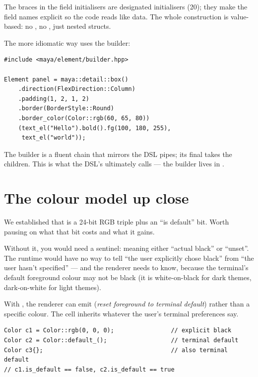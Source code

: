 The braces in the field initialisers are designated initialisers
(\cpp{}20); they make the field names explicit so the code reads
like data. The whole construction is value-based: no ,
no , just nested structs.

The more idiomatic way uses the  builder:

\begin{lstlisting}
#include <maya/element/builder.hpp>

Element panel = maya::detail::box()
    .direction(FlexDirection::Column)
    .padding(1, 2, 1, 2)
    .border(BorderStyle::Round)
    .border_color(Color::rgb(60, 65, 80))
    (text_el("Hello").bold().fg(100, 180, 255),
     text_el("world"));
\end{lstlisting}

The builder is a fluent chain that mirrors the DSL pipes; its final
 takes the children. This is what the DSL's
 ultimately calls --- the builder lives in
.

\section{The colour model up close}
\label{sec:elem:color}

We established that  is a 24-bit RGB triple plus an
``is default'' bit. Worth pausing on what that bit costs and what it
gains.

Without it, you would need a sentinel: 
meaning either ``actual black'' or ``unset''. The runtime would
have no way to tell ``the user explicitly chose black'' from ``the
user hasn't specified'' --- and the renderer needs to know, because
the terminal's default foreground colour may not be black (it is
white-on-black for dark themes, dark-on-white for light themes).

With , the renderer can emit
\code{ESC[39m} (\emph{reset foreground to terminal default}) rather
than a specific colour. The cell inherits whatever the user's
terminal preferences say.

\begin{lstlisting}
Color c1 = Color::rgb(0, 0, 0);                // explicit black
Color c2 = Color::default_();                  // terminal default
Color c3{};                                    // also terminal default
// c1.is_default == false, c2.is_default == true
\end{lstlisting}

